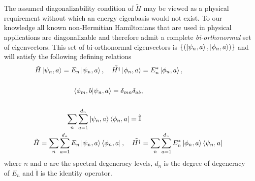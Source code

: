 \documentclass[12pt, a4paper]{report}
\begin{document}
The assumed diagonalizability condition of $\tilde{H}$ may be viewed as a physical requirement without which an energy eigenbasis would not exist. To our knowledge all known non-Hermitian Hamiltonians that are used in physical applications are diagonalizable and therefore admit a complete \emph{bi-orthonormal} set of eigenvectors. This set of bi-orthonormal eigenvectors is $\{(\ket{\psi_{n}, a}, \ket{\phi_{n}, a})\}$ and will satisfy the following defining relations\cite{Pseudo-HermiticityIII}
\begin{align}
\tilde{H}\ket{\psi_{n}, a} = E_{n}\ket{\psi_{n}, a},\quad\tilde{H^{\dagger}}\ket{\phi_{n}, a} &= E^{*}_{n}\ket{\phi_{n}, a},\\
\nonumber\\
\braket{\phi_{m}, b|\psi_{n}, a} = \delta_{mn}\delta_{ab}&,\\
\nonumber\\
\sum^{}_{n}\sum_{a=1}^{d_n}\ket{\psi_{n}, a}\bra{\phi_{n}, a} = \hat{\mathbb{I}}&\\
\tilde{H} = \sum^{}_{n}\sum_{a=1}^{d_n}E_{n}\ket{\psi_{n}, a}\bra{\phi_{n}, a},\quad\tilde{H^{\dagger}} &= \sum^{}_{n}\sum_{a=1}^{d_n}E_{n}^{*}\ket{\phi_{n}, a}\bra{\psi_{n}, a}
\end{align}
where $n$ and $a$ are the spectral degeneracy levels, $d_n$ is the degree of degeneracy of $E_n$ and $\hat{\mathbb{I}}$ is the identity operator\cite{Pseudo-HermiticityIII}.

\end{document}
